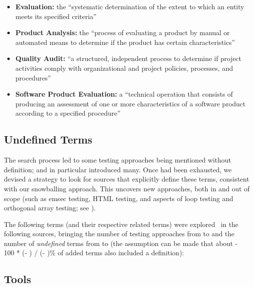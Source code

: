     \begin{itemize}
        \item \textbf{Evaluation:} the ``systematic determination of the extent
              to which an entity meets its specified criteria''
              \citep[p.~167]{IEEE2017}
        \item \textbf{Product Analysis:} the ``process of evaluating a product by
              manual or automated means to determine if the product has certain
              characteristics'' \citep[p.~343]{IEEE2017}
        \item \textbf{Quality Audit:} ``a structured, independent process to
              determine if project activities comply with organizational and
              project policies, processes, and procedures'' \citep[p.~361]{IEEE2017}
        \item \textbf{Software Product Evaluation:} a ``technical operation that
              consists of producing an assessment of one or more characteristics
              of a software product according to a specified procedure''
              \citep[p.~424]{IEEE2017}
    \end{itemize}
\fi
\subsection{Undefined Terms}
\label{undef-terms}

The search process led to some testing approaches being
mentioned without definition;
\citep{IEEE2022} and \citep{Firesmith2015} in particular introduced many.
Once \stds{} had been exhausted, we devised a strategy to
look for sources that explicitly define these terms, consistent with
our snowballing approach. This uncovers new approaches, both in and out of
scope (such as \acf{emsec} testing, HTML testing, and aspects of loop testing and
orthogonal array testing\ifnotpaper; see \fi).

The following terms (and their respective related terms) were explored%
\ifnotpaper\ in the following sources\fi, bringing the number of testing
approaches from \the\TotalBefore{} to \the\TotalAfter{} and the number of
\emph{undefined} terms from \the\UndefBefore{} to \the\UndefAfter{} (the
assumption can be made that about \the{} - 100 * (\UndefAfter -
\UndefBefore) / (\TotalAfter - \TotalBefore)\relax\% of added terms also
included a definition):



\ifnotpaper\else
    \ieeeTestTermsTable{}  %
    \subsection{Tools}  %
    \graphGenDesc{}
\fi
